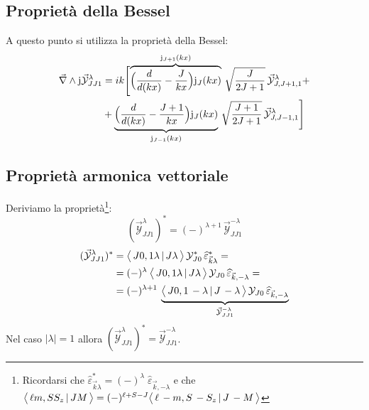 \subsection{Proprietà della Bessel}
A questo punto si utilizza la proprietà della Bessel:
\begin{align*}
	\vec{\nabla}\land\mathrm{j}\vec{\mathcal{Y}}_{JJ1}^\lambda &= ik \Biggl [ \overbrace{\Bigl ( \frac{d}{d(kx)} - \frac{J}{kx} \Bigr ) \mathrm{j}_{J}(kx) }^{\mathrm{j}_{J+1}(kx)}\, \sqrt{\frac{J}{2J+1}}\, \vec{\mathcal{Y}}_{J,J+1,1}^\lambda + \\
	&+ \underbrace{\Bigl ( \frac{d}{d(kx)} - \frac{J+1}{kx} \Bigr ) \mathrm{j}_{J}(kx) }_{\mathrm{j}_{J-1}(kx)}\, \sqrt{\frac{J+1}{2J+1}}\, \vec{\mathcal{Y}}_{J,J-1,1}^\lambda \Biggr ]
\end{align*}
\subsection{Proprietà armonica vettoriale}\label{compl-passaggi-armonica}
Deriviamo la proprietà\footnote{Ricordarsi che $\widehat{\varepsilon}_{\vec{k}\lambda}^* = (-)^\lambda \; \widehat{\varepsilon}_{\vec{k},-\lambda}$ e che $\bigl\langle\, \ell m, S S_z\, |\, J M\, \bigr\rangle = (-)^{\ell+S-J} \bigl\langle\, \ell\, -m, S\, -S_z\, |\, J \,-M\, \bigr\rangle $}:
$$(\vec{\mathcal{Y}}_{JJ1}^\lambda)^* = (-)^{\lambda+1}\,\vec{\mathcal{Y}}^{-\lambda}_{JJ1}$$
\begin{align*}
	(\vec{\mathcal{Y}}_{JJ1}^\lambda)^* &= \bigl\langle\, J0,1\lambda\, |\, J\lambda\, \bigr\rangle \, \mathcal{Y}_{J0}^* \, \widehat{\varepsilon}_{\vec{k}\lambda}^* = \\
	&= (-)^\lambda \: \bigl\langle\, J0,1\lambda\, |\, J\lambda\, \bigr\rangle \, \mathcal{Y}_{J0} \, \widehat{\varepsilon}_{\vec{k},-\lambda} = \\
	&= (-)^{\lambda+1} \: \underbrace{\bigl\langle\, J0,1\,-\lambda\, |\, J\,-\lambda\, \bigr\rangle \, \mathcal{Y}_{J0} \, \widehat{\varepsilon}_{\vec{k},-\lambda}}_{\vec{\mathcal{Y}}_{JJ1}^{-\lambda}}
\end{align*}
Nel caso $|\lambda|=1$ allora $(\vec{\mathcal{Y}}_{JJ1}^\lambda)^* = \vec{\mathcal{Y}}_{JJ1}^{-\lambda}$.

